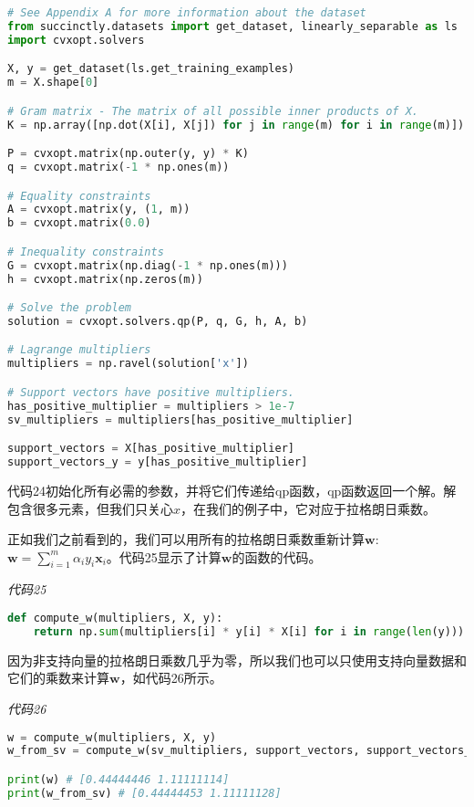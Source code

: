 \begin{lstlisting}[language=python]
# See Appendix A for more information about the dataset 
from succinctly.datasets import get_dataset, linearly_separable as ls
import cvxopt.solvers 

X, y = get_dataset(ls.get_training_examples) 
m = X.shape[0] 

# Gram matrix - The matrix of all possible inner products of X. 
K = np.array([np.dot(X[i], X[j]) for j in range(m) for i in range(m)]).reshape((m, m)) 

P = cvxopt.matrix(np.outer(y, y) * K) 
q = cvxopt.matrix(-1 * np.ones(m)) 

# Equality constraints
A = cvxopt.matrix(y, (1, m)) 
b = cvxopt.matrix(0.0) 

# Inequality constraints 
G = cvxopt.matrix(np.diag(-1 * np.ones(m))) 
h = cvxopt.matrix(np.zeros(m)) 

# Solve the problem 
solution = cvxopt.solvers.qp(P, q, G, h, A, b) 

# Lagrange multipliers 
multipliers = np.ravel(solution['x']) 

# Support vectors have positive multipliers. 
has_positive_multiplier = multipliers > 1e-7 
sv_multipliers = multipliers[has_positive_multiplier] 

support_vectors = X[has_positive_multiplier] 
support_vectors_y = y[has_positive_multiplier]

\end{lstlisting}

代码24初始化所有必需的参数，并将它们传递给qp函数，qp函数返回一个解。解包含很多元素，但我们只关心$x$，在我们的例子中，它对应于拉格朗日乘数。

正如我们之前看到的，我们可以用所有的拉格朗日乘数重新计算$\mathbf{w}$:$\mathbf{w}=\sum\limits_{i=1}^m \alpha_i y_i \mathbf{x}_i$。代码25显示了计算$\mathbf{w}$的函数的代码。

\emph{代码25}
\begin{lstlisting}[language=python]
def compute_w(multipliers, X, y): 
    return np.sum(multipliers[i] * y[i] * X[i] for i in range(len(y)))

\end{lstlisting}

因为非支持向量的拉格朗日乘数几乎为零，所以我们也可以只使用支持向量数据和它们的乘数来计算$\mathbf{w}$，如代码26所示。


\emph{代码26}
\begin{lstlisting}[language=python]
w = compute_w(multipliers, X, y) 
w_from_sv = compute_w(sv_multipliers, support_vectors, support_vectors_y) 

print(w) # [0.44444446 1.11111114] 
print(w_from_sv) # [0.44444453 1.11111128]

\end{lstlisting}

